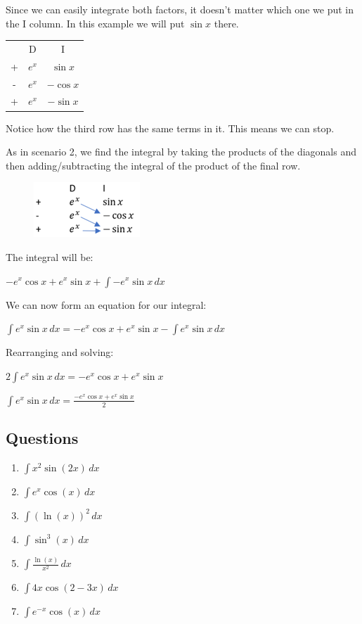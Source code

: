 \documentclass[../main.tex]{subfiles}
\begin{document}
Since we can easily integrate both factors, it doesn’t matter which one we put in the I column. In this example we will put \(\sin{x}\) there.

\begin{tabular}{ c c c }
   & D & I \\ 
 +  & $e^x$ &$\sin{x}$ \\  
 - & $e^x$ & $-\cos{x}$\\
  + & $e^x$ & $-\sin{x}$ \\  
\end{tabular}

Notice how the third row has the same terms in it. This means we can stop.

As in scenario 2, we find the integral by taking the products of the diagonals and then adding/subtracting the integral of the product of the final row.

\begin{figure}[h]
    \includegraphics{images/dimethod3.png}
\end{figure}

The integral will be:

\(-e^x\cos{x}+e^x\sin{x}+\int -e^x\sin{x}\,dx\)

We can now form an equation for our integral:

\(\int e^x \sin{x}\,dx=-e^x\cos{x}+e^x\sin{x}-\int e^x\sin{x}\,dx\)

Rearranging and solving:

\(2\int e^x \sin{x}\,dx=-e^x\cos{x}+e^x\sin{x}\)

\(\int e^x \sin{x}\, dx=\frac{-e^x\cos{x}+e^x\sin{x}}{2}\)

\pagebreak

\subsection*{Questions}
\label{DI Method}
\begin{enumerate}
    \item \(\int x^2\sin{(2x)}\, dx\)

    \item \(\int e^x \cos{(x)}\, dx\)

    \item \(\int (\ln{(x)})^2\, dx\)

    \item \(\int \sin^3{(x)}\,dx\)

    \item \(\int \frac{\ln{(x)}}{x^2}\, dx\)

    \item \(\int 4x\cos{(2-3x)}\, dx\)

    \item \(\int e^{-x}\cos{(x)}\, dx\)

    
\end{enumerate}


\pagebreak
\end{document}
